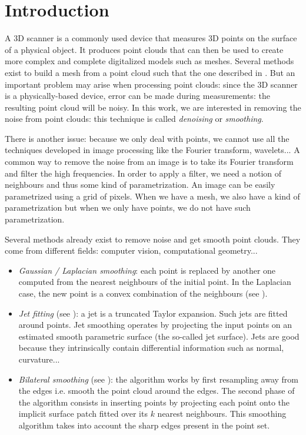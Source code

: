 \chapter{Introduction}

A 3D scanner is a commonly used device that measures 3D points on the surface of
a physical object.  It produces point clouds that can then be used to create
more complex and complete digitalized models such as meshes. Several methods
exist to build a mesh from a point cloud such that the one described in
\cite{alexa2003computing}. But an important problem may arise when processing
point clouds: since the 3D scanner is a physically-based device, error can be
made during measurements: the resulting point cloud will be noisy. In this work,
we are interested in removing the noise from point clouds: this technique is
called \textit{denoising} or \textit{smoothing}.

There is another issue: because we only deal with points, we cannot use all the
techniques developed in image processing like the Fourier transform, wavelets...
A common way to remove the noise from an image is to take its Fourier transform
and filter the high frequencies. In order to apply a filter, we need a notion of
neighbours and thus some kind of parametrization. An image can be easily
parametrized using a grid of pixels. When we have a mesh, we also have a kind of
parametrization but when we only have points, we do not have such
parametrization.

Several methods already exist to remove noise and get smooth point clouds.
They come from different fields: computer vision, computational geometry...

\begin{itemize}
    \item \textit{Gaussian / Laplacian smoothing}: each point is replaced by
        another one computed from the nearest neighbours of the initial point. In
        the Laplacian case, the new point is a convex combination of the
        neighbours (see \cite{vollmer1999improved}).
    \item \textit{Jet fitting} (see \cite{cazals2005estimating}): a jet is a truncated
        Taylor expansion. Such jets are fitted around points. Jet smoothing
        operates by projecting the input points on an estimated smooth
        parametric surface (the so-called jet surface). Jets are good because
        they intrinsically contain differential information such as normal,
        curvature...
    \item \textit{Bilateral smoothing} (see \cite{huang2013edge}): the algorithm
        works by first resampling away from the edges i.e. smooth the point
        cloud around the edges. The second phase of the algorithm consists in
        inserting points by projecting each point onto the implicit surface
        patch fitted over its $ k $ nearest neighbours. This smoothing algorithm
        takes into account the sharp edges present in the point set.
\end{itemize}

